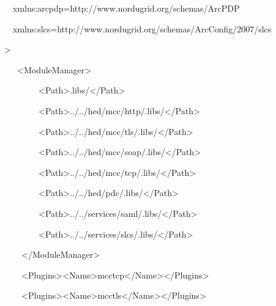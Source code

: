 \documentclass{article}
\begin{document}
{\ttfamily\color{black}
\ \ xmlns:arcpdp={\textquotedbl}http://www.nordugrid.org/schemas/ArcPDP{\textquotedbl}}

{\ttfamily\color{black}
\ \ xmlns:slcs={\textquotedbl}http://www.nordugrid.org/schemas/ArcConfig/2007/slcs{\textquotedbl}}

{\ttfamily\color{black}
{\textgreater}}

{\ttfamily\color{black}
 \ \ \ {\textless}ModuleManager{\textgreater}}

{\ttfamily\color{black}
\ \ \ \ \ \ \ \ {\textless}Path{\textgreater}.libs/{\textless}/Path{\textgreater}}

{\ttfamily\color{black}
\ \ \ \ \ \ \ \ {\textless}Path{\textgreater}../../hed/mcc/http/.libs/{\textless}/Path{\textgreater}}

{\ttfamily\color{black}
\ \ \ \ \ \ \ \ {\textless}Path{\textgreater}../../hed/mcc/tls/.libs/{\textless}/Path{\textgreater}}

{\ttfamily\color{black}
\ \ \ \ \ \ \ \ {\textless}Path{\textgreater}../../hed/mcc/soap/.libs/{\textless}/Path{\textgreater}}

{\ttfamily\color{black}
\ \ \ \ \ \ \ \ {\textless}Path{\textgreater}../../hed/mcc/tcp/.libs/{\textless}/Path{\textgreater}}

{\ttfamily\color{black}
\ \ \ \ \ \ \ \ {\textless}Path{\textgreater}../../hed/pdc/.libs/{\textless}/Path{\textgreater}}

{\ttfamily\color{black}
\ \ \ \ \ \ \ \ {\textless}Path{\textgreater}../../services/saml/.libs/{\textless}/Path{\textgreater}}

{\ttfamily\color{black}
\ \ \ \ \ \ \ \ {\textless}Path{\textgreater}../../services/slcs/.libs/{\textless}/Path{\textgreater}}

{\ttfamily\color{black}
\ \ \ \ {\textless}/ModuleManager{\textgreater}}

{\ttfamily\color{black}
\ \ \ \ {\textless}Plugins{\textgreater}{\textless}Name{\textgreater}mcctcp{\textless}/Name{\textgreater}{\textless}/Plugins{\textgreater}}

{\ttfamily\color{black}
\ \ \ \ {\textless}Plugins{\textgreater}{\textless}Name{\textgreater}mcctls{\textless}/Name{\textgreater}{\textless}/Plugins{\textgreater}}
\end{document}
